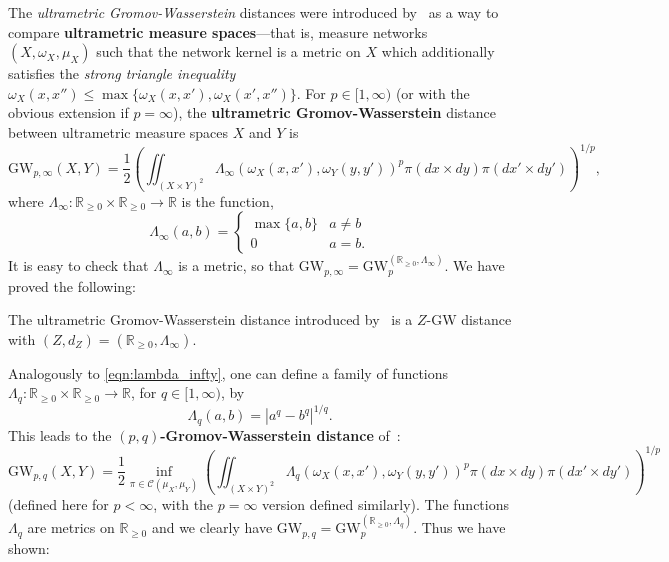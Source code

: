 \documentclass[twoside,11pt]{article}
\theoremstyle{definition}
\newcommand{\R}{\mathbb{R}}
\newcommand{\define}[1]{\textbf{#1}}
\begin{document}
The \emph{ultrametric Gromov-Wasserstein} distances were introduced by~\citet{memoli2021ultrametric} as a way to compare \define{ultrametric measure spaces}---that is, measure networks $(X,\omega_X,\mu_X)$ such that the network kernel is a metric on $X$ which additionally satisfies the \emph{strong triangle inequality} $\omega_X(x,x'') \leq \max\{\omega_X(x,x'),\omega_X(x',x'')\}$. For $p \in [1,\infty)$ (or with the obvious extension if $p = \infty$), the \define{ultrametric Gromov-Wasserstein} distance between ultrametric measure spaces $X$ and $Y$ is 
\begin{equation}
\mathrm{GW}_{p,\infty}(X,Y) = \frac{1}{2} \left(\iint_{(X \times Y)^2}  \Lambda_\infty(\omega_X(x,x'),\omega_Y(y,y'))^p \pi(dx \times dy) \pi(dx' \times dy') \right)^{1/p},
\end{equation}
where $\Lambda_\infty:\R_{\geq 0} \times \R_{\geq 0} \to \R$ is the function, 
\begin{equation}\label{eqn:lambda_infty}
\Lambda_\infty(a,b) = \left\{\begin{array}{cl}
\max\{a,b\} & a \neq b \\
0 & a = b. \end{array}\right.
\end{equation}
It is easy to check that $\Lambda_\infty$ is a metric, so that $\mathrm{GW}_{p,\infty} = \mathrm{GW}_p^{(\R_{\geq 0},\Lambda_\infty)}$. We have proved the following:

\begin{proposition}\label{prop:uGWasZGW}
    The ultrametric Gromov-Wasserstein distance introduced by~\citet{memoli2021ultrametric} is a $Z$-GW distance with $(Z,d_Z) = (\R_{\geq 0}, \Lambda_\infty)$.
\end{proposition}

Analogously to \eqref{eqn:lambda_infty}, one can define a family of functions  $\Lambda_q:\R_{\geq 0} \times \R_{\geq 0} \to \R$, for $q \in [1,\infty)$, by 
\begin{equation}\label{eqn:q_metrics}
\Lambda_q(a,b) = |a^q - b^q|^{1/q}. 
\end{equation}
This leads to the \define{$(p,q)$-Gromov-Wasserstein distance} of~\citet{arya2023gromov}:
\begin{equation}\label{eqn:GWpq}
\mathrm{GW}_{p,q}(X,Y) = \frac{1}{2}\inf_{\pi \in \mathcal{C}(\mu_X,\mu_Y)} \left(\iint_{(X \times Y)^2} \Lambda_q(\omega_X(x,x'),\omega_Y(y,y'))^p \pi(dx \times dy) \pi(dx' \times dy') \right)^{1/p}
\end{equation}
(defined here for $p < \infty$, with the $p=\infty$ version defined similarly). The functions $\Lambda_q$ are metrics on $\R_{\geq 0}$ \citep[Proposition 1.13]{arya2023gromov} and we clearly have $\mathrm{GW}_{p,q} = \mathrm{GW}_p^{(\R_{\geq 0},\Lambda_q)}$. Thus we have shown:
\end{document}
